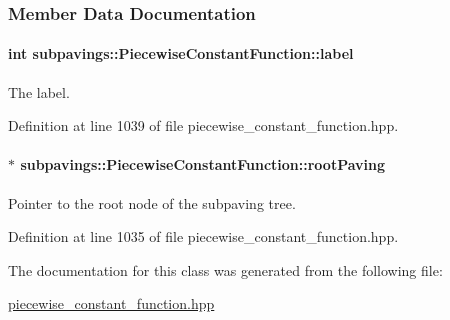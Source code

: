 \subsubsection{\-Member \-Data \-Documentation}
\hypertarget{classsubpavings_1_1PiecewiseConstantFunction_a622a9d3b705f1c81cd7a5a7b95e8d4c8}{
\paragraph[{label}]{\setlength{\rightskip}{0pt plus 5cm}int {\bf subpavings\-::\-Piecewise\-Constant\-Function\-::label}}}\label{classsubpavings_1_1PiecewiseConstantFunction_a622a9d3b705f1c81cd7a5a7b95e8d4c8}
\-The label. 

\-Definition at line 1039 of file piecewise\-\_\-constant\-\_\-function.\-hpp.

\hypertarget{classsubpavings_1_1PiecewiseConstantFunction_aef23daaf4b73237b67ed40985b3038a3}{
\paragraph[{root\-Paving}]{$\ast$ {\bf subpavings\-::\-Piecewise\-Constant\-Function\-::root\-Paving}}}\label{classsubpavings_1_1PiecewiseConstantFunction_aef23daaf4b73237b67ed40985b3038a3}


\-Pointer to the root node of the subpaving tree. 



\-Definition at line 1035 of file piecewise\-\_\-constant\-\_\-function.\-hpp.



\-The documentation for this class was generated from the following file\-:\begin{DoxyCompactItemize}
\item 
\hyperlink{piecewise__constant__function_8hpp}{piecewise\-\_\-constant\-\_\-function.\-hpp}\end{DoxyCompactItemize}
